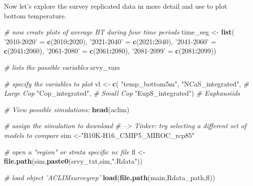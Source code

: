 \documentclass[
]{article}
\newenvironment{Shaded}{\begin{snugshade}}{\end{snugshade}}
\newcommand{\CommentTok}[1]{\textcolor[rgb]{0.56,0.35,0.01}{\textit{#1}}}
\newcommand{\DecValTok}[1]{\textcolor[rgb]{0.00,0.00,0.81}{#1}}
\newcommand{\KeywordTok}[1]{\textcolor[rgb]{0.13,0.29,0.53}{\textbf{#1}}}
\newcommand{\NormalTok}[1]{#1}
\newcommand{\OperatorTok}[1]{\textcolor[rgb]{0.81,0.36,0.00}{\textbf{#1}}}
\newcommand{\StringTok}[1]{\textcolor[rgb]{0.31,0.60,0.02}{#1}}
\begin{document}
Now let's explore the survey replicated data in more detail and use to
plot bottom temperature.

\begin{Shaded}
\begin{Highlighting}[]
    \CommentTok{# now create plots of average BT during four time periods}
\NormalTok{    time_seg   <-}\StringTok{ }\KeywordTok{list}\NormalTok{( }\StringTok{'2010-2020'}\NormalTok{ =}\StringTok{ }\KeywordTok{c}\NormalTok{(}\DecValTok{2010}\OperatorTok{:}\DecValTok{2020}\NormalTok{),}
                        \StringTok{'2021-2040'}\NormalTok{ =}\StringTok{ }\KeywordTok{c}\NormalTok{(}\DecValTok{2021}\OperatorTok{:}\DecValTok{2040}\NormalTok{),}
                        \StringTok{'2041-2060'}\NormalTok{ =}\StringTok{ }\KeywordTok{c}\NormalTok{(}\DecValTok{2041}\OperatorTok{:}\DecValTok{2060}\NormalTok{),}
                        \StringTok{'2061-2080'}\NormalTok{ =}\StringTok{ }\KeywordTok{c}\NormalTok{(}\DecValTok{2061}\OperatorTok{:}\DecValTok{2080}\NormalTok{),}
                        \StringTok{'2081-2099'}\NormalTok{ =}\StringTok{ }\KeywordTok{c}\NormalTok{(}\DecValTok{2081}\OperatorTok{:}\DecValTok{2099}\NormalTok{))}
    
    \CommentTok{# lists the possible variables}
\NormalTok{    srvy_vars}
    
    \CommentTok{# specify the variables to plot}
\NormalTok{    vl        <-}\StringTok{ }\KeywordTok{c}\NormalTok{(}
                  \StringTok{"temp_bottom5m"}\NormalTok{,}
                  \StringTok{"NCaS_integrated"}\NormalTok{, }\CommentTok{# Large Cop}
                  \StringTok{"Cop_integrated"}\NormalTok{,  }\CommentTok{# Small Cop}
                  \StringTok{"EupS_integrated"}\NormalTok{) }\CommentTok{# Euphausiids}
    
    \CommentTok{# View possible simulations:}
    \KeywordTok{head}\NormalTok{(aclim)}
    
    \CommentTok{# assign the simulation to download}
    \CommentTok{# --> Tinker: try selecting a different set of models to compare}
\NormalTok{    sim        <-}\StringTok{"B10K-H16_CMIP5_MIROC_rcp85"} 
    
    \CommentTok{# open a "region" or strata specific nc file}
\NormalTok{    fl         <-}\StringTok{ }\KeywordTok{file.path}\NormalTok{(sim,}\KeywordTok{paste0}\NormalTok{(srvy_txt,sim,}\StringTok{".Rdata"}\NormalTok{))}
    
    \CommentTok{# load object 'ACLIMsurveyrep'}
    \KeywordTok{load}\NormalTok{(}\KeywordTok{file.path}\NormalTok{(main,Rdata_path,fl))   }
     

\end{Highlighting}
\end{Shaded}
\end{document}
